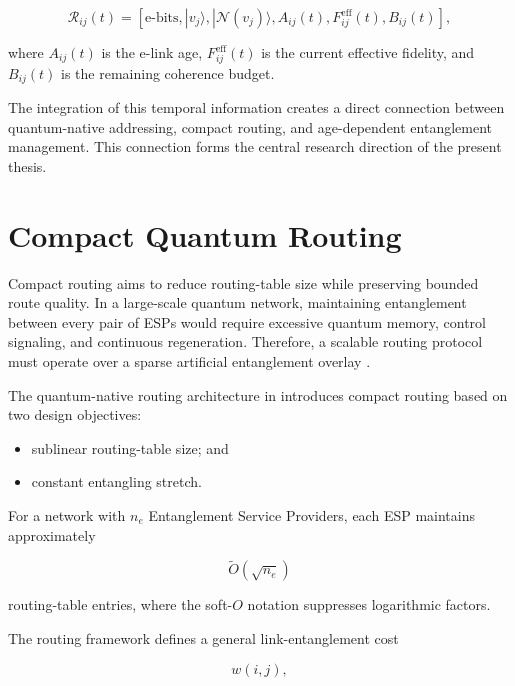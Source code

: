 \begin{equation}
    \mathcal{R}_{ij}(t)
    =
    \left[
    \text{e-bits},
    |v_j\rangle,
    |\mathcal{N}(v_j)\rangle,
    A_{ij}(t),
    F_{ij}^{\mathrm{eff}}(t),
    B_{ij}(t)
    \right],
\end{equation}

where $A_{ij}(t)$ is the e-link age, $F_{ij}^{\mathrm{eff}}(t)$ is the current effective fidelity, and $B_{ij}(t)$ is the remaining coherence budget.

The integration of this temporal information creates a direct connection between quantum-native addressing, compact routing, and age-dependent entanglement management. This connection forms the central research direction of the present thesis.
\section{Compact Quantum Routing}

Compact routing aims to reduce routing-table size while preserving bounded route quality. In a large-scale quantum network, maintaining entanglement between every pair of ESPs would require excessive quantum memory, control signaling, and continuous regeneration. Therefore, a scalable routing protocol must operate over a sparse artificial entanglement overlay \cite{caleffi2025quantumarchitecture}.

The quantum-native routing architecture in \cite{caleffi2025quantumarchitecture} introduces compact routing based on two design objectives:

\begin{itemize}
    \item sublinear routing-table size; and
    \item constant entangling stretch.
\end{itemize}

For a network with $n_e$ Entanglement Service Providers, each ESP maintains approximately

\begin{equation}
    \widetilde{O}
    \left(
    \sqrt{n_e}
    \right)
\end{equation}

routing-table entries, where the soft-$O$ notation suppresses logarithmic factors.

The routing framework defines a general link-entanglement cost

\begin{equation}
    w(i,j),
\end{equation}

